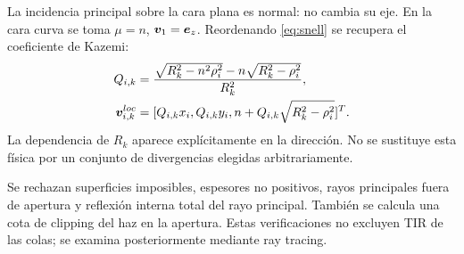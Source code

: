La incidencia principal sobre la cara plana es normal: no cambia su eje. En la cara curva se toma $\mu=n$, $\bm{v}_1=\bm{e}_z$. Reordenando \eqref{eq:snell} se recupera el coeficiente de Kazemi:
\begin{align}
Q_{i,k}&=\frac{\sqrt{R_k^2-n^2\rho_i^2}-n\sqrt{R_k^2-\rho_i^2}}{R_k^2},\\
\bm{v}_{i,k}^{loc}&=[Q_{i,k}x_i,Q_{i,k}y_i,n+Q_{i,k}\sqrt{R_k^2-\rho_i^2}]^T.
\end{align}
La dependencia de $R_k$ aparece explícitamente en la dirección. No se sustituye esta física por un conjunto de divergencias elegidas arbitrariamente.

Se rechazan superficies imposibles, espesores no positivos, rayos principales fuera de apertura y reflexión interna total del rayo principal. También se calcula una cota de clipping del haz en la apertura. Estas verificaciones no excluyen TIR de las colas; se examina posteriormente mediante ray tracing.

